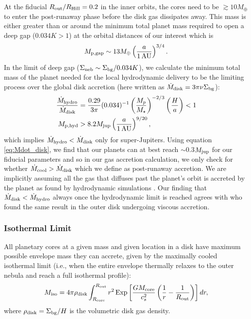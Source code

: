 \documentclass[twocolumn]{aastex631}
\begin{document}
At the fiducial $R_{\rm out}/R_{\rm Hill} = 0.2$ in the inner orbits, the cores need to be $\gtrsim 10M_\oplus$ to enter the post-runaway phase before the disk gas dissipates away. This mass is either greater than or around the minimum total planet mass required to open a deep gap ($0.034 K > 1$) at the orbital distances of our interest which is
\begin{equation}
    M_{\rm p,gap} \sim 13 M_\oplus \left(\frac{a}{1\,{\rm AU}}\right)^{3/4}.
\end{equation}
In the limit of deep gap ($\Sigma_{\rm neb} \sim \Sigma_{\rm bg}/0.034 K$), we calculate the minimum total mass of the planet needed for the local hydrodynamic delivery to be the limiting process over the global disk accretion (here written as $\dot{M}_{\rm disk} = 3\pi\nu\Sigma_{\rm bg}$):
\begin{align}
    \frac{\dot{M}_{\rm hydro}}{\dot{M}_{\rm disk}} &= \frac{0.29}{3\pi}(0.034)^{-1}\left(\frac{M_p}{M_\star}\right)^{-2/3}\left(\frac{H}{a}\right) < 1 \nonumber \\
    M_{\rm p,hyd} &> 8.2 M_{\rm jup} \left(\frac{a}{1\,{\rm AU}}\right)^{9/20},
\end{align}
which implies $\dot{M}_{\rm hydro} < \dot{M}_{\rm disk}$ only for super-Jupiters. Using equation \ref{eq:Mdot_disk}, we find that our planets can at best reach $\sim$0.3$M_{\rm jup}$ for our fiducial parameters and so in our gas accretion calculation, we only check for whether $\dot{M}_{\rm cool} > \dot{M}_{\rm disk}$ which we define as post-runaway accretion. We are implicitly assuming all the gas that diffuses past the planet's orbit is accreted by the planet as found by hydrodynamic simulations \citep[e.g.,][]{Lubow06}. Our finding that $\dot{M}_{\rm disk} < \dot{M}_{\rm hydro}$ always once the hydrodynamic limit is reached agrees with \citet{Rosenthal20} who found the same result in the outer disk undergoing viscous accretion.

\subsubsection{Isothermal Limit}

All planetary cores at a given mass and given location in a disk have maximum possible envelope mass they can accrete, given by the maximally cooled isothermal limit (i.e., when the entire envelope thermally relaxes to the outer nebula and reach a full isothermal profile):
\begin{equation}
    \label{eq:Miso}
    M_{\rm iso} = 4\pi\rho_{\rm disk}\int^{R_{\rm out}}_{R_{\rm core}} r^2\,{\rm Exp}\left[\frac{GM_{\rm core}}{c_{s}^2}\left(\frac{1}{r}-\frac{1}{R_{\rm out}}\right)\right]dr,
\end{equation}
where $\rho_{\rm disk} = \Sigma_{\rm bg}/H$ is the volumetric disk gas density. 
\end{document}
